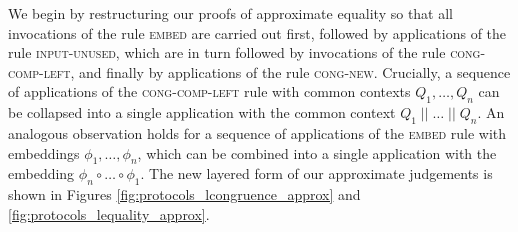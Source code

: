 We begin by restructuring our proofs of approximate equality so that all invocations of the rule \textsc{embed} are carried out first, followed by applications of the rule \textsc{input-unused}, which are in turn followed by invocations of the rule \textsc{cong-comp-left}, and finally by applications of the rule \textsc{cong-new}. Crucially, a sequence of applications of the \textsc{cong-comp-left} rule with common contexts $Q_1, \ldots, Q_n$ can be collapsed into a single application with the common context $Q_1  \; || \; \ldots \; || \; Q_n$. An analogous observation holds for a sequence of applications of the \textsc{embed} rule with embeddings $\phi_1, \ldots, \phi_n$, which can be combined into a single application with the embedding $\phi_n \circ \ldots \circ \phi_1$. The new layered form of our approximate judgements is shown in Figures \ref{fig:protocols_lcongruence_approx} and \ref{fig:protocols_lequality_approx}.

